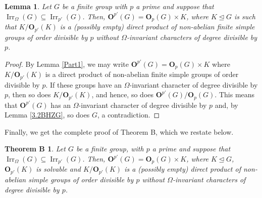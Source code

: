 \documentclass[12pt]{amsart}
\theoremstyle{theorem}
\newtheorem*{thmB}{Theorem B}
\newtheorem{lem}[teo]{Lemma}
\theoremstyle{definition}
\newcommand{\bO}{{\mathbf O}}
\newcommand{\Irr}{{\operatorname{Irr}}}
\begin{document}
	\begin{lem}
		\label{Part2}
		Let $G$ be a finite group with $p$ a prime and suppose that $\Irr_{\Omega}(G) \subseteq \Irr_{p'}(G)$. Then, $\bO^{p'}(G) = \bO_p(G) \times K$, where $K \unlhd G$ is such that $K/\bO_{p'}(K)$ is a (possibly empty) direct product of non-abelian finite simple groups of order divisible by $p$ without $\Omega$-invariant characters of degree divisible by $p$.
	\end{lem}

	\begin{proof}
		By Lemma \ref{Part1}, we may write $\bO^{p'}(G) = \bO_p(G) \times K$ where $K/\bO_{p'}(K)$ is a direct product of non-abelian finite simple groups of order divisible by $p$. If these groups have an $\Omega$-invariant character of degree divisible by $p$, then so does $K/\bO_{p'}(K)$, and hence, so does $\bO^{p'}(G)/\bO_p(G)$. This means that $\bO^{p'}(G)$ has an $\Omega$-invariant character of degree divisible by $p$ and, by Lemma \ref{3.2BHZG}, so does $G$, a contradiction.
	\end{proof}
	
	Finally, we get the complete proof of Theorem B, which we restate below.
	
	\begin{thmB}
		Let $G$ be a finite group, with $p$ a prime and suppose that $\Irr_{\Omega}(G) \subseteq \Irr_{p'}(G)$.
		Then, $\bO^{p'}(G) = \bO_p(G) \times K$, where $K \unlhd G$, $\bO_{p'}(K)$ is solvable and $K/\bO_{p'}(K)$ is a (possibly empty) direct product of non-abelian simple groups of order divisible by $p$ without $\Omega$-invariant characters of degree divisible by $p$.
	\end{thmB}
	
\end{document}
